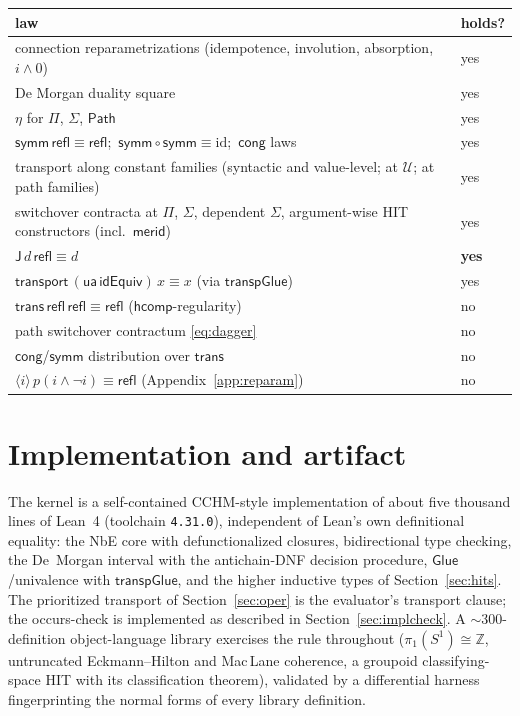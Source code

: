 \documentclass{lmcs}
\newcommand{\hcomp}{\mathsf{hcomp}}
\newcommand{\refl}{\mathsf{refl}}
\newcommand{\J}{\mathsf{J}}
\newcommand{\ua}{\mathsf{ua}}
\newcommand{\Glue}{\mathsf{Glue}}
\renewcommand{\conv}{\equiv}
\newcommand{\Path}{\mathsf{Path}}
\newcommand{\U}{\mathcal{U}}
\begin{document}
\begin{center}
\small
\begin{tabular}{ll}
  law & holds? \\\hline
  connection reparametrizations (idempotence, involution,
    absorption, $i \wedge 0$) & yes \\
  De Morgan duality square & yes \\
  $\eta$ for $\Pi$, $\Sigma$, $\Path$ & yes \\
  $\mathsf{symm}\,\refl \conv \refl$;\
    $\mathsf{symm}\circ\mathsf{symm} \conv \mathrm{id}$;\
    $\mathsf{cong}$ laws & yes \\
  transport along constant families (syntactic and value-level; at
    $\U$; at path families) & yes \\
  switchover contracta at $\Pi$, $\Sigma$, dependent $\Sigma$,
    argument-wise HIT constructors (incl.\ $\mathsf{merid}$) & yes \\
  $\J\,d\,\refl \conv d$ & \textbf{yes} \\
  $\mathsf{transport}\,(\ua\,\mathsf{idEquiv})\,x \conv x$
    (via $\mathsf{transpGlue}$) & yes \\
  $\mathsf{trans}\,\refl\,\refl \conv \refl$
    ($\hcomp$-regularity) & no \\
  path switchover contractum \eqref{eq:dagger} & no \\
  $\mathsf{cong}$/$\mathsf{symm}$ distribution over
    $\mathsf{trans}$ & no \\
  $\langle i\rangle\, p(i \wedge \neg i) \conv \refl$
    (Appendix~\ref{app:reparam}) & no \\
\end{tabular}
\end{center}

\section{Implementation and artifact}
\label{sec:impl}

The kernel is a self-contained CCHM-style implementation of about
five thousand lines of Lean~4 (toolchain \texttt{4.31.0}),
independent of Lean's own definitional equality: the NbE core with
defunctionalized closures, bidirectional type checking, the De~Morgan
interval with the antichain-DNF decision procedure,
$\Glue$/univalence with $\mathsf{transpGlue}$, and the higher
inductive types of Section~\ref{sec:hits}.  The prioritized transport
of Section~\ref{sec:oper} is the evaluator's transport clause; the
occurs-check is implemented as described in
Section~\ref{sec:implcheck}.  A $\sim$300-definition object-language
library exercises the rule throughout ($\pi_1(S^1) \cong \mathbb{Z}$,
untruncated Eckmann--Hilton and Mac\,Lane coherence, a groupoid
classifying-space HIT with its classification theorem), validated by
a differential harness fingerprinting the normal forms of every
library definition.
\end{document}
